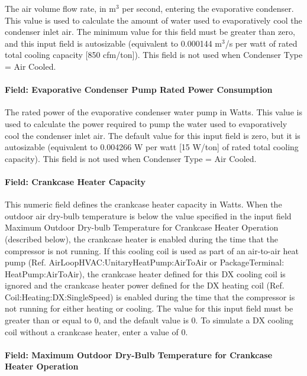 The air volume flow rate, in m\(^{3}\) per second, entering the evaporative condenser. This value is used to calculate the amount of water used to evaporatively cool the condenser inlet air. The minimum value for this field must be greater than zero, and this input field is autosizable (equivalent to 0.000144 m\(^{3}\)/s per watt of rated total cooling capacity {[}850 cfm/ton{]}). This field is not used when Condenser Type = Air Cooled.

\paragraph{Field: Evaporative Condenser Pump Rated Power Consumption}\label{field-evaporative-condenser-pump-rated-power-consumption}

The rated power of the evaporative condenser water pump in Watts. This value is used to calculate the power required to pump the water used to evaporatively cool the condenser inlet air. The default value for this input field is zero, but it is autosizable (equivalent to 0.004266 W per watt {[}15 W/ton{]} of rated total cooling capacity). This field is not used when Condenser Type = Air Cooled.

\paragraph{Field: Crankcase Heater Capacity}\label{field-crankcase-heater-capacity}

This numeric field defines the crankcase heater capacity in Watts. When the outdoor air dry-bulb temperature is below the value specified in the input field Maximum Outdoor Dry-bulb Temperature for Crankcase Heater Operation (described below), the crankcase heater is enabled during the time that the compressor is not running. If this cooling coil is used as part of an air-to-air heat pump (Ref. AirLoopHVAC:UnitaryHeatPump:AirToAir or PackageTerminal: HeatPump:AirToAir), the crankcase heater defined for this DX cooling coil is ignored and the crankcase heater power defined for the DX heating coil (Ref. Coil:Heating:DX:SingleSpeed) is enabled during the time that the compressor is not running for either heating or cooling. The value for this input field must be greater than or equal to 0, and the default value is 0. To simulate a DX cooling coil without a crankcase heater, enter a value of 0.

\paragraph{Field: Maximum Outdoor Dry-Bulb Temperature for Crankcase Heater Operation}\label{field-maximum-outdoor-dry-bulb-temperature-for-crankcase-heater-operation}

